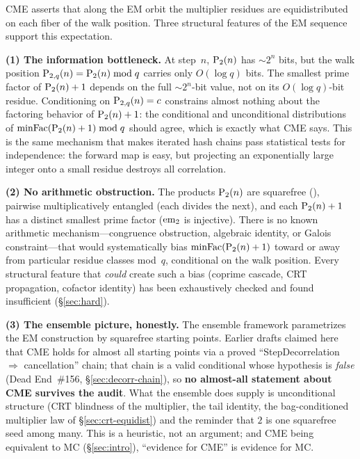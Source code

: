 \begin{remark}
\label{rem:why-dsl}
CME asserts that along the EM orbit the multiplier residues are
equidistributed on each fiber of the walk position.  Three structural
features of the EM sequence support this expectation.

\smallskip
\noindent\textbf{(1) The information bottleneck.}\enspace
At step~$n$, $\mathrm{P}_{2}(n)$ has ${\sim}2^n$ bits, but the walk
position $\mathrm{P}_{2,q}(n) = \mathrm{P}_{2}(n) \bmod q$ carries only
$O(\log q)$ bits.  The smallest prime factor of $\mathrm{P}_{2}(n)+1$
depends on the full ${\sim}2^n$-bit value, not on its $O(\log q)$-bit
residue.  Conditioning on $\mathrm{P}_{2,q}(n) = c$ constrains almost
nothing about the factoring behavior of $\mathrm{P}_{2}(n)+1$: the
conditional and unconditional distributions of
$\mathrm{minFac}(\mathrm{P}_{2}(n)+1) \bmod q$ should agree, which is exactly what
CME says.  This is the same mechanism that makes iterated hash chains
pass statistical tests for independence: the forward map is easy, but
projecting an exponentially large integer onto a small residue
destroys all correlation.

\smallskip
\noindent\textbf{(2) No arithmetic obstruction.}\enspace
The products $\mathrm{P}_{2}(n)$ are squarefree
(), pairwise
multiplicatively entangled (each divides the next), and each
$\mathrm{P}_{2}(n)+1$ has a distinct smallest prime factor
($\mathrm{em}_{2}$ is injective).  There is no known
arithmetic mechanism---congruence obstruction, algebraic identity, or
Galois constraint---that would systematically bias
$\mathrm{minFac}(\mathrm{P}_{2}(n)+1)$ toward or away from particular residue
classes mod~$q$, conditional on the walk position.  Every structural
feature that \emph{could} create such a bias (coprime cascade, CRT
propagation, cofactor identity) has been exhaustively checked and
found insufficient (\S\ref{sec:hard}).

\smallskip
\noindent\textbf{(3) The ensemble picture, honestly.}\enspace
The ensemble framework parametrizes the EM construction by squarefree
starting points.  Earlier drafts claimed here that CME holds for almost
all starting points via a proved ``StepDecorrelation~$\Rightarrow$
cancellation'' chain; that chain is a valid conditional whose
hypothesis is \emph{false} (Dead End~\#156, \S\ref{sec:decorr-chain}),
so \textbf{no almost-all statement about CME survives the audit}.  What
the ensemble does supply is unconditional structure (CRT blindness of
the multiplier, the tail identity, the bag-conditioned multiplier law of
\S\ref{sec:crt-equidist}) and the reminder that $2$ is one squarefree seed
among many.  This is a heuristic, not an argument; and CME being
equivalent to MC (\S\ref{sec:intro}), ``evidence for CME'' is evidence
for MC.


\end{remark}
